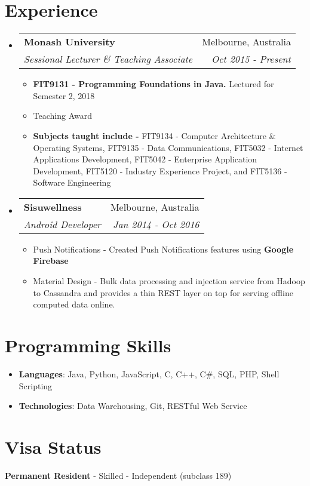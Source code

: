 \documentclass[letterpaper,11pt]{article}
\makeatletter
\newcommand{\resumeItem}[2]{
  \item\small{
    {#1}{ #2 \vspace{-2pt}}
  }
}
\newcommand{\resumeSubheading}[4]{
  \vspace{-1pt}\item
    \begin{tabular*}{0.97\textwidth}[t]{l@{\extracolsep{\fill}}r}
      \textbf{#1} & #2 \\
      \textit{\small#3} & \textit{\small #4} \\
    \end{tabular*}\vspace{-5pt}
}
\newcommand{\resumeSubItem}[2]{\resumeItem{#1}{#2}\vspace{-4pt}}
\newcommand{\resumeSubHeadingListStart}{\begin{itemize}[leftmargin=*]}
\newcommand{\resumeSubHeadingListEnd}{\end{itemize}}
\newcommand{\resumeItemListStart}{\begin{itemize}}
\newcommand{\resumeItemListEnd}{\end{itemize}\vspace{-5pt}}
\makeatother
\begin{document}
\section{Experience}
  \resumeSubHeadingListStart
    \resumeSubheading
      {Monash University}{Melbourne, Australia}
      {Sessional Lecturer \& Teaching Associate}{Oct 2015 - Present}
      \newline
      \resumeItemListStart
        \resumeItem{\textbf{FIT9131 - Programming Foundations in Java.}}
        {Lectured for Semester 2, 2018}
        \resumeItem{Teaching Award}{}
        \resumeItem{\textbf{Subjects taught include - }}{FIT9134 - Computer Architecture \& Operating Systems,
         FIT9135 - Data Communications, 
         FIT5032 - Internet Applications Development,
         FIT5042 - Enterprise Application Development, 
         FIT5120 - Industry Experience Project,
         and
         FIT5136 - Software Engineering}       
      \resumeItemListEnd
    \resumeSubheading
      {Sisuwellness}{Melbourne, Australia}
      {Android Developer}{Jan 2014 - Oct 2016}
      \resumeItemListStart
        \resumeItem{Push Notifications - }
          {Created Push Notifications features using \textbf{Google Firebase}}
        \resumeItem{Material Design - }
          {Bulk data processing and injection service from Hadoop to Cassandra and provides a thin REST layer on top for serving offline computed data online.}
      \resumeItemListEnd

  \resumeSubHeadingListEnd



%
\section{Programming Skills}
 \resumeSubHeadingListStart
   \item{
     \textbf{Languages}{: Java, Python, JavaScript, C, C++, C\#, SQL, PHP, Shell Scripting}     
   }
   \item{
    \textbf{Technologies}{: Data Warehousing, Git, RESTful Web Service}
   }
 \resumeSubHeadingListEnd

 \section{Visa Status}
 \textbf{Permanent Resident} - Skilled - Independent (subclass 189)


\end{document}

